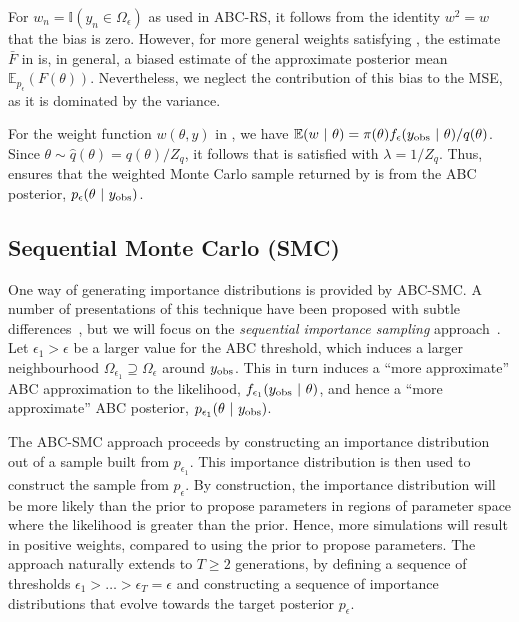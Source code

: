 \documentclass[review,demo]{siamonline190516}
\begin{document}
\begin{note}
For $w_n = \mathbb I(y_n \in \Omega_\epsilon)$ as used in ABC-RS, it follows from the identity $w^2 = w$ that the bias is zero.
However, for more general weights satisfying , the estimate $\bar F$ in  is, in general, a biased estimate of the approximate posterior mean $\mathbb E_{p_\epsilon}(F(\theta))$.
Nevertheless, we neglect the contribution of this bias to the MSE, as it is dominated by the variance.
\end{note}

For the weight function $w(\theta, y)$ in , we have $\mathbb E(w~|~\theta) = \pi(\theta) f_\epsilon(y_{\mathrm{obs}}~|~\theta) / q(\theta)$.
Since $\theta \sim \hat q(\theta) = q(\theta)/Z_q$, it follows that  is satisfied with $\lambda = 1/Z_q$.
Thus,  ensures that the weighted Monte Carlo sample returned by  is from the ABC posterior, $p_\epsilon(\theta~|~y_{\mathrm{obs}})$.

\subsection{Sequential Monte Carlo (SMC)}
\label{s:SMC}

One way of generating importance distributions is provided by ABC-SMC.
A number of presentations of this technique have been proposed with subtle differences~\cite{Beaumont2009,DelMoral2006,Sisson2007}, but we will focus on the \emph{sequential importance sampling} approach~\cite{Toni2009}. 
Let $\epsilon_1 > \epsilon$ be a larger value for the ABC threshold, which induces a larger neighbourhood $\Omega_{\epsilon_1} \supseteq \Omega_\epsilon$ around $y_{\mathrm{obs}}$.
This in turn induces a ``more approximate'' ABC approximation to the likelihood, $f_{\epsilon_1}(y_{\mathrm{obs}}~|~\theta)$, and hence a ``more approximate'' ABC posterior, $p_{\epsilon_1}(\theta~|~y_{\mathrm{obs}})$.

The ABC-SMC approach proceeds by constructing an importance distribution out of a sample built from $p_{\epsilon_1}$.
This importance distribution is then used to construct the sample from $p_\epsilon$.
By construction, the importance distribution will be more likely than the prior to propose parameters in regions of parameter space where the likelihood is greater than the prior.
Hence, more simulations will result in positive weights, compared to using the prior to propose parameters.
The approach naturally extends to $T \geq 2$ generations, by defining a sequence of thresholds $\epsilon_1 > \dots > \epsilon_T = \epsilon$ and constructing a sequence of importance distributions that evolve towards the target posterior $p_\epsilon$.
\end{document}
